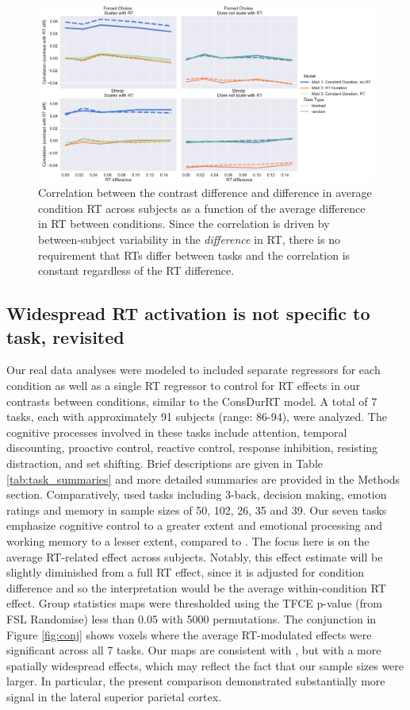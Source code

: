 \documentclass[titlepage,12pt] {article}
\begin{document}
\begin{figure}
  \centering
   \includegraphics[width=5in]{Figures/cor_with_rt.pdf}
   \caption{Correlation between the contrast difference and difference in average condition RT across subjects as a function of the average difference in RT between conditions.  Since the correlation is driven by between-subject variability in the \emph{difference} in RT, there is no requirement that RTs differ between tasks and the correlation is constant regardless of the RT difference. }
  \label{fig:rt-cor}
\end{figure}




\subsection*{Widespread RT activation is not specific to task, revisited}

Our real data analyses were modeled to included separate regressors for each condition as well as a single RT regressor to control for RT effects in our contrasts between conditions, similar to the ConsDurRT model.  A total of 7 tasks, each with approximately 91 subjects (range: 86-94), were analyzed. The cognitive processes involved in these tasks include attention, temporal discounting, proactive control, reactive control, response inhibition, resisting distraction, and set shifting.  Brief descriptions are given in Table \ref{tab:task_summaries} and more detailed summaries are provided in the Methods section.  Comparatively, \citet{yarkoni_bold_2009} used tasks including  3-back, decision making, emotion ratings and memory in sample sizes of 50, 102, 26, 35 and 39. Our seven tasks emphasize cognitive control to a greater extent and emotional processing and working memory to a lesser extent, compared to \citet{yarkoni_bold_2009}.   The focus here is on the average RT-related effect across subjects.  Notably, this effect estimate will be slightly diminished from a full RT effect, since it is adjusted for condition difference and so the interpretation would be the average within-condition RT effect. Group statistics maps were thresholded using the TFCE p-value (from FSL Randomise) less than 0.05 with 5000 permutations.  The conjunction in Figure \ref{fig:conj} shows voxels where the average RT-modulated effects were significant across all 7 tasks.  Our maps are consistent with \citet{yarkoni_bold_2009}, but with a more spatially widespread effects, which may reflect the fact that our sample sizes were larger. In particular, the present comparison demonstrated substantially more signal in the lateral superior parietal cortex.
\end{document}
